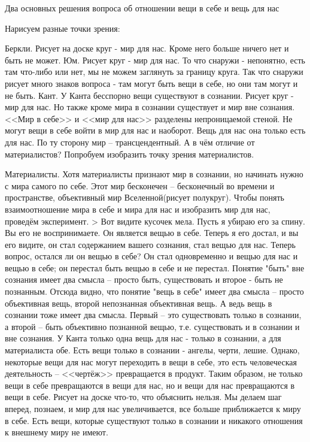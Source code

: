 Два основных решения вопроса об отношении вещи в себе и вещь для нас

Нарисуем разные точки зрения:

    Беркли. Рисует на доске круг - мир для нас. Кроме него больше ничего нет и быть не может.
    Юм. Рисует круг - мир для нас. То что снаружи - непонятно, есть там что-либо или нет, мы не можем заглянуть за границу круга. Так что снаружи рисует много знаков вопроса - там могут быть вещи в себе, но они там могут и не быть.
    Кант. У Канта бесспорно вещи существуют в сознании. Рисует круг - мир для нас. Но также кроме мира в сознании существует и мир вне сознания. <<Мир в себе>> и <<мир для нас>> разделены непроницаемой стеной. Не могут вещи в себе войти в мир для нас и наоборот. Вещь для нас она только есть для нас. По ту сторону мир – трансцендентный. А в чём отличие от материалистов? Попробуем изобразить точку зрения материалистов.

    Материалисты. Хотя материалисты признают мир в сознании, но начинать нужно с мира самого по себе. Этот мир бесконечен – бесконечный во времени и пространстве, объективный мир Вселенной(рисует полукруг). Чтобы понять взаимоотношение мира в себе и мира для нас и изобразить мир для нас, проведём эксперимент. > Вот видите кусочек мела. Пусть я убираю его за спину. Вы его не воспринимаете. Он является вещью в себе. Теперь я его достал, и вы его видите, он стал содержанием вашего сознания, стал вещью для нас. Теперь вопрос, остался ли он вещью в себе? Он стал одновременно и вещью для нас и вещью в себе; он перестал быть вещью в себе и не перестал. Понятие "быть" вне сознания имеет два смысла – просто быть, существовать и второе - быть не познанным. Отсюда видно, что понятие "вещь в себе" имеет два смысла – просто объективная вещь, второй непознанная объективная вещь. А ведь вещь в сознании тоже имеет два смысла. Первый – это существовать только в сознании, а второй – быть объективно познанной вещью, т.е. существовать и в сознании и вне сознания. У Канта только одна вещь для нас - только в сознании, а для материалиста обе. Есть вещи только в сознании - ангелы, черти, лешие. Однако, некоторые вещи для нас могут переходить в вещи в себе, это есть человеческая деятельность – <<чертёж>> превращается в продукт. Таким образом, не только вещи в себе превращаются в вещи для нас, но и вещи для нас превращаются в вещи в себе. Рисует на доске что-то, что объяснить нельзя. Мы делаем шаг вперед, познаем, и мир для нас увеличивается, все больше приближается к миру в себе. Есть вещи, которые существуют только в сознании и никакого отношения к внешнему миру не имеют.

